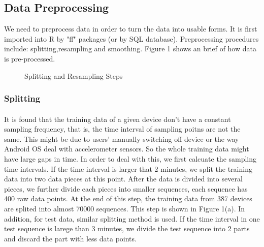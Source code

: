 \documentclass[11pt,letterpaper]{article}
\begin{document}
\subsection{Data Preprocessing}
\label{sec:data}
We need to preprocess data in order to turn the data into usable forms. It is first imported into R by "ff" packages (or by SQL database). Preprocessing procedures include: splitting,resampling and smoothing. Figure 1 shows an brief of how data is pre-processed.
\begin{figure}
	\centering
	\caption{Splitting and Resampling Steps}
\end{figure}

\subsubsection{Splitting}
		\paragraph{} It is found that the training data of a given device don’t have a constant sampling frequency, that is, the time interval of sampling poitns are not the same. This might be due to users’ manually switching off device or the way Android OS deal with accelerometer sensors. So the whole training data might have large gaps in time. In order to deal with this, we first calcuate the sampling time intervals. If the time interval is larger that 2 minutes, we split the training data into two data pieces at this point. After the data is divided into several pieces, we further divide each pieces into smaller sequences, each sequence has 400 raw data points. At the end of this step, the training data from 387 devices are splited into almost 70000 sequences. This step is shown in Figure 1(a). In addition, for test data, similar splitting method is used. If the time interval in one test sequence is larege than 3 minutes, we divide the test sequence into 2 parts and discard the part with less data points.
\end{document}
